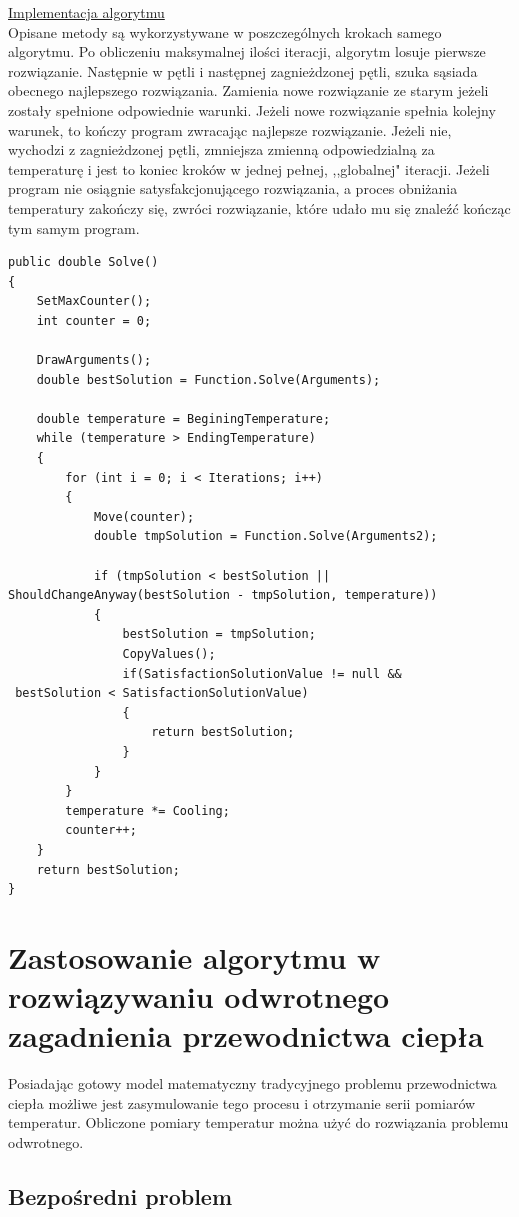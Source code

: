 \documentclass[twoside]{projektInzynierskiMS1}
\newcommand{\si}{ś}
\begin{document}
\underline{Implementacja algorytmu} \\
Opisane metody są wykorzystywane w poszczególnych krokach samego algorytmu. Po obliczeniu maksymalnej ilo\si ci iteracji, algorytm losuje pierwsze rozwiązanie. Następnie w pętli i następnej zagnieżdzonej pętli, szuka sąsiada obecnego najlepszego rozwiązania. Zamienia nowe rozwiązanie ze starym jeżeli zostały spełnione odpowiednie warunki. Jeżeli nowe rozwiązanie spełnia kolejny warunek, to kończy program zwracając najlepsze rozwiązanie. Jeżeli nie, wychodzi z zagnieżdzonej pętli, zmniejsza zmienną odpowiedzialną za temperaturę i jest to koniec kroków w jednej pełnej, ,,globalnej" iteracji. Jeżeli program nie osiągnie satysfakcjonującego rozwiązania, a proces obniżania temperatury zakończy się, zwróci rozwiązanie, które udało mu się znaleźć kończąc tym samym program.

\begin{verbatim}
public double Solve()
{
    SetMaxCounter();
    int counter = 0;

    DrawArguments();
    double bestSolution = Function.Solve(Arguments);

    double temperature = BeginingTemperature;
    while (temperature > EndingTemperature)
    {
        for (int i = 0; i < Iterations; i++)
        {
            Move(counter);
            double tmpSolution = Function.Solve(Arguments2);

            if (tmpSolution < bestSolution || 
ShouldChangeAnyway(bestSolution - tmpSolution, temperature))
            {
                bestSolution = tmpSolution;
                CopyValues();
                if(SatisfactionSolutionValue != null &&
 bestSolution < SatisfactionSolutionValue)
                {
                    return bestSolution;
                }
            }
        }
        temperature *= Cooling;
        counter++;
    }
    return bestSolution;
}
\end{verbatim}

\section{Zastosowanie algorytmu w rozwiązywaniu odwrotnego zagadnienia przewodnictwa ciepła}
Posiadając gotowy model matematyczny tradycyjnego problemu przewodnictwa ciepła możliwe jest zasymulowanie tego procesu i otrzymanie serii pomiarów temperatur. Obliczone pomiary temperatur można użyć do rozwiązania problemu odwrotnego. 
\subsection{Bezpo\si redni problem}
\end{document}
